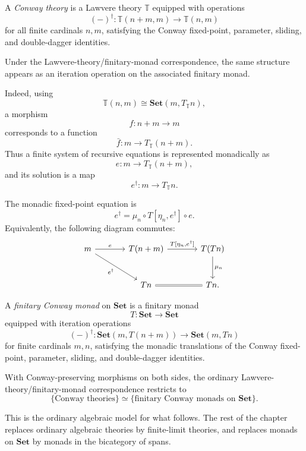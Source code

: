 \begin{definition}
\label{def:conway-theory}
A \emph{Conway theory} is a Lawvere theory \(\mathbb T\) equipped with
operations
\[
(-)^\dagger:
\mathbb T(n+m,m)\to \mathbb T(n,m)
\]
for all finite cardinals \(n,m\), satisfying the Conway fixed-point,
parameter, sliding, and double-dagger identities.
\end{definition}

Under the Lawvere-theory/finitary-monad correspondence, the same structure
appears as an iteration operation on the associated finitary monad.

Indeed, using
\[
\mathbb T(n,m)
\cong
\mathbf{Set}(m,T_{\mathbb T}n),
\]
a morphism
\[
f:n+m\to m
\]
corresponds to a function
\[
\bar f:m\to T_{\mathbb T}(n+m).
\]
Thus a finite system of recursive equations is represented monadically as
\[
e:m\to T_{\mathbb T}(n+m),
\]
and its solution is a map
\[
e^\dagger:m\to T_{\mathbb T}n.
\]

The monadic fixed-point equation is
\[
e^\dagger
=
\mu_n\circ T[\eta_n,e^\dagger]\circ e.
\]
Equivalently, the following diagram commutes:
\[
\begin{tikzcd}[column sep=large,row sep=large]
m
  \arrow[r,"e"]
  \arrow[dr,"{e^\dagger}"']
&
T(n+m)
  \arrow[r,"{T[\eta_n,e^\dagger]}"]
&
T(Tn)
  \arrow[d,"\mu_n"]
\\
&
Tn
  \arrow[r,equal]
&
Tn .
\end{tikzcd}
\]

\begin{definition}
\label{def:finitary-conway-monad}
A \emph{finitary Conway monad} on \(\mathbf{Set}\) is a finitary monad
\[
T:\mathbf{Set}\to\mathbf{Set}
\]
equipped with iteration operations
\[
(-)^\dagger:
\mathbf{Set}(m,T(n+m))
\to
\mathbf{Set}(m,Tn)
\]
for finite cardinals \(m,n\), satisfying the monadic translations of the
Conway fixed-point, parameter, sliding, and double-dagger identities.
\end{definition}

With Conway-preserving morphisms on both sides, the ordinary
Lawvere-theory/finitary-monad correspondence restricts to
\[
\boxed{
\{\text{Conway theories}\}
\simeq
\{\text{finitary Conway monads on }\mathbf{Set}\}.
}
\]

This is the ordinary algebraic model for what follows.  The rest of the
chapter replaces ordinary algebraic theories by finite-limit theories, and
replaces monads on \(\mathbf{Set}\) by monads in the bicategory of spans.

